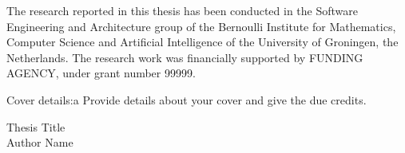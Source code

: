 \thispagestyle{empty}
\noindent

The research reported in this thesis has been conducted
in the Software Engineering and Architecture group
of the Bernoulli Institute for Mathematics, Computer Science
and Artificial Intelligence of the University of Groningen, the Netherlands.
%
The research work was financially supported by FUNDING AGENCY,
under grant number 99999.

\vfill\vfill

\noindent
Cover details:a Provide details about your cover and give the due credits. 

\vfill

\noindent Thesis Title\\
\noindent Author Name\\

\clearpage
\normalsize
